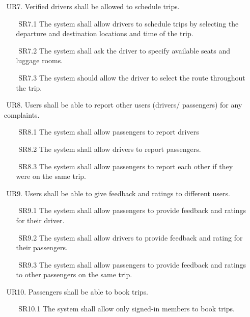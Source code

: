 \documentclass[a4paper, 12pt]{report} %
\begin{document}
\begin{itemize}
\begin{itemize}
                \end{itemize}
                \item [$ $] UR7. Verified drivers shall be allowed to schedule trips.
                \begin{itemize}
                    \item [$ $] SR7.1 The system shall allow drivers to schedule trips by selecting the departure and destination locations and time of the trip.
                    \item [$ $] SR7.2  The system shall ask the driver to specify available seats and luggage rooms.
                    \item [$ $] SR7.3  The system should allow the driver to select the route throughout the trip.
                \end{itemize}
                \item [$ $] UR8. Users shall be able to report other users (drivers/ passengers) for any complaints. 
                \begin{itemize}
                    \item [$ $] SR8.1 The system shall allow passengers to report drivers 
                    \item [$ $] SR8.2 The system shall allow drivers to report passengers.
                    \item [$ $] SR8.3 The system shall allow passengers to report each other if they were on the same trip.
                    \end{itemize}
                \item [$ $] UR9. Users shall be able to give feedback and ratings to different users.
                \begin{itemize}
                    \item [$ $] SR9.1 The system shall allow passengers to provide feedback and ratings for their driver.
                    \item [$ $] SR9.2  The system shall allow drivers to provide feedback and rating for their passengers.
                    \item [$ $] SR9.3 The system shall allow passengers to provide feedback and ratings to other passengers on the same trip.
                \end{itemize}
                \item [$ $] UR10. Passengers shall be able to book trips.
                \begin{itemize}
                    \item [$ $] SR10.1 The system shall allow only signed-in members to book trips.

\end{itemize}
\end{itemize}
\end{document}
